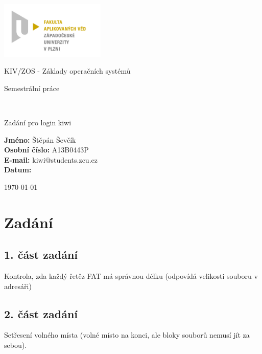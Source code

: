 \documentclass[12pt,a4paper]{article}
\author{Jan Šmejkal}
\let\oldsection\section
\renewcommand\section{\clearpage\oldsection}
\begin{document}
\begin{titlepage}

\includegraphics[width=50mm]{img/FAV.jpg}
\\[160 pt]
\centerline{ \Huge \sc KIV/ZOS - Základy operačních systémů}
\centerline{ \huge \sc Semestrální práce }
\\[12 pt]
{\large \sc
\centerline{Zadání pro login kiwi}
}


{
\vfill 
\parindent=0cm
\textbf{Jméno:} Štěpán Ševčík\\
\textbf{Osobní číslo:} A13B0443P\\
\textbf{E-mail:} kiwi@students.zcu.cz\\
\textbf{Datum:} {\large \today\par} %

}

\end{titlepage}


\newpage
\setcounter{page}{2}
\setcounter{tocdepth}{3}
\tableofcontents

\section{Zadání}
\subsection{1. část zadání}
Kontrola, zda každý řetěz FAT má správnou délku (odpovídá velikosti souboru v adresáři)
\subsection{2. část zadání}
Setřesení volného místa (volné místo na konci, ale bloky souborů nemusí jít za sebou).
\end{document}
